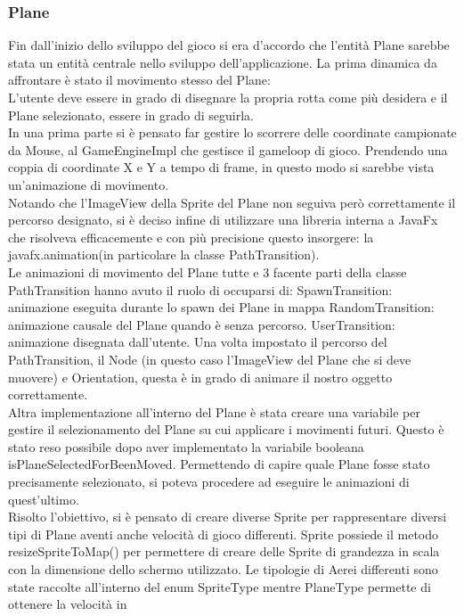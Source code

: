 \documentclass[a4paper,12pt]{report}
\begin{document}
\subsubsection{Plane}
Fin dall’inizio dello sviluppo del gioco si era d’accordo che l’entità Plane sarebbe stata un entità centrale nello sviluppo dell’applicazione.
La prima dinamica da affrontare è stato il movimento stesso del Plane:
\\
L’utente deve essere in grado di disegnare la propria rotta come più desidera e il Plane selezionato, essere in grado di seguirla.
\\
In una prima parte si è pensato far gestire lo scorrere delle coordinate campionate da Mouse, al GameEngineImpl che gestisce il gameloop 
di gioco.
Prendendo una coppia di coordinate X e Y a tempo di frame, in questo modo si sarebbe vista un’animazione di movimento.
\\
Notando che l’ImageView della Sprite del Plane non seguiva però correttamente il percorso designato, si è deciso infine di utilizzare una 
libreria interna a JavaFx che risolveva efficacemente e con più precisione questo insorgere: la javafx.animation(in particolare la classe 
PathTransition).
\\
Le animazioni di movimento del Plane tutte e 3 facente parti della classe PathTransition hanno avuto il ruolo di occuparsi di:
	SpawnTransition: animazione eseguita durante lo spawn dei Plane in mappa
	RandomTransition: animazione causale del Plane quando è senza percorso.
	UserTransition: animazione disegnata dall’utente.
Una volta impostato il percorso del PathTransition, il Node (in questo caso l’ImageView del Plane che si deve muovere) e Orientation, questa 
è in grado di animare il nostro oggetto correttamente.
\\
Altra implementazione all’interno del Plane è stata creare una variabile per gestire il selezionamento del Plane su cui applicare i movimenti 
futuri.
Questo è stato reso possibile dopo aver implementato la variabile booleana isPlaneSelectedForBeenMoved.
Permettendo di capire quale Plane fosse stato precisamente selezionato, si poteva procedere ad eseguire le animazioni di quest’ultimo.
\\
Risolto l’obiettivo, si è pensato di creare diverse Sprite per rappresentare diversi tipi di Plane aventi anche velocità di gioco differenti.
Sprite possiede il metodo resizeSpriteToMap() per permettere di creare delle Sprite di grandezza in scala con la dimensione dello schermo 
utilizzato.
Le tipologie di Aerei differenti sono state raccolte all’interno del enum SpriteType mentre PlaneType permette di ottenere la velocità in 
\end{document}
